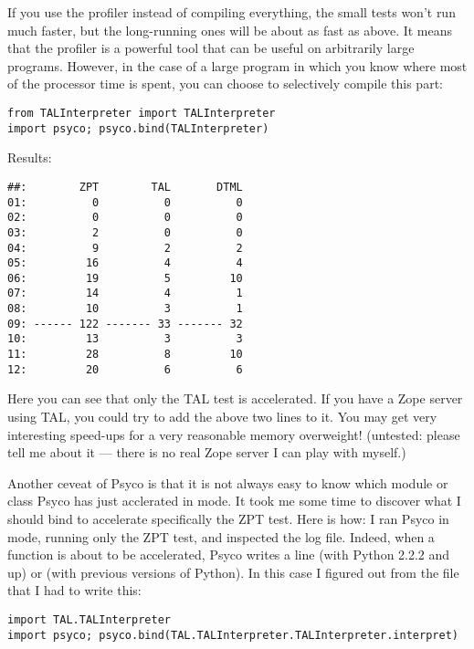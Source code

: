 \documentclass{manual}
\begin{document}
If you use the profiler instead of compiling everything, the small tests won't run much faster, but the long-running ones will be about as fast as above.  It means that the profiler is a powerful tool that can be useful on arbitrarily large programs.  However, in the case of a large program in which you know where most of the processor time is spent, you can choose to selectively compile this part:

\begin{verbatim}
from TALInterpreter import TALInterpreter
import psyco; psyco.bind(TALInterpreter)
\end{verbatim}

Results:

\begin{verbatim}
##:        ZPT        TAL       DTML
01:          0          0          0
02:          0          0          0
03:          2          0          0
04:          9          2          2
05:         16          4          4
06:         19          5         10
07:         14          4          1
08:         10          3          1
09: ------ 122 ------- 33 ------- 32
10:         13          3          3
11:         28          8         10
12:         20          6          6
\end{verbatim}

Here you can see that only the TAL test is accelerated.  If you have a Zope server using TAL, you could try to add the above two lines to it.  You may get very interesting speed-ups for a very reasonable memory overweight!  (untested: please tell me about it --- there is no real Zope server I can play with myself.)

Another ceveat of Psyco is that it is not always easy to know which module or class Psyco has just acclerated in  mode.  It took me some time to discover what I should bind to accelerate specifically the ZPT test.  Here is how: I ran Psyco in  mode, running only the ZPT test, and inspected the log file.  Indeed, when a function is about to be accelerated, Psyco writes a line  (with Python 2.2.2 and up) or  (with previous versions of Python).  In this case I figured out from the  file that I had to write this:

\begin{verbatim}
import TAL.TALInterpreter
import psyco; psyco.bind(TAL.TALInterpreter.TALInterpreter.interpret)
\end{verbatim}
\end{document}
